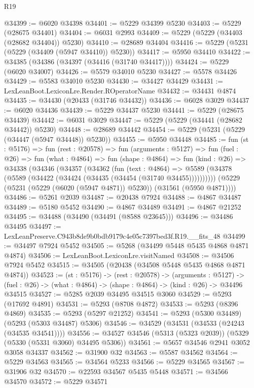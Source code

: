 \begin{lexlean}{R19}
\begin{coremodule}
@34399 := @6020 @34398
@34401 := @5229 @34399 @5230
@34403 := @5229 (@28675 @34401)
@34404 := @6031 @2993
@34409 := @5229 (@5229 (@34403 (@28682 @34404)) @5230)
@34410 := @28689 @34404
@34416 := @5229 (@5231 (@5229 (@34409 (@5947 @34410)) @5230))
@34417 := @5950 @34410
@34422 := @34385 (@34386 (@34397 (@34416 (@31740 @34417))))
@34424 := @5229 (@6020 @34007)
@34426 := @5579 @34010 @5230
@34427 := @5578 @34426
@34429 := @5583 @34010 @5230
@34430 := @34427 @34429
@34431 := LexLeanBoot.LexiconLre.Render.ROperatorName
@34432 := @34431 @4874
@34435 := @34430 (@20433 (@31746 @34432))
@34436 := @6028 @3029
@34437 := @6020 @34436
@34439 := @5229 @34437 @5230
@34441 := @5229 (@28675 @34439)
@34442 := @6031 @3029
@34447 := @5229 (@5229 (@34441 (@28682 @34442)) @5230)
@34448 := @28689 @34442
@34454 := @5229 (@5231 (@5229 (@34447 (@5947 @34448)) @5230))
@34455 := @5950 @34448
@34485 := fun (st : @5176) =>
  fun (rest : @20578) =>
  fun (arguments : @5127) =>
  fun (fuel : @26) =>
  fun (what : @4864) =>
  fun (shape : @4864) =>
  fun (kind : @26) =>
  @34338
    (@34346
      (@34357
        (@34362
          (fun (text : @4864) =>
          @5589 (@34378 (@5589 (@34422 (@34424 (@34435 (@34454 (@31740 @34455))))))))))
      (@5229 (@5231 (@5229 (@6020 (@5947 @4871)) @5230)) (@31561 (@5950 @4871))))
@34486 := @5261 @2039
@34487 := @20438 @7924
@34488 := @4867 @34487
@34489 := @5180 @5452
@34490 := @4867 @34489
@34491 := @4867 @21252
@34495 := @34488 (@34490 (@34491 (@8588 @23645)))
@34496 := @34486 @34495
@34497 := LexLeanPreserve.C943b8de9b0bdb9179c4e05c7397bed3f.R19.__fits_48
@34499 := @34497 @7924 @5452
@34505 := @5268 (@34499 @5448 @5435 @4868 @4871 @4874)
@34506 := LexLeanBoot.LexiconLre.visitNamed
@34508 := @34506 @7924 @5452
@34515 := @34505 (@20438 (@34508 @5448 @5435 @4868 @4871 @4874))
@34523 := (st : @5176) ->
  (rest : @20578) ->
  (arguments : @5127) ->
  (fuel : @26) -> (what : @4864) -> (shape : @4864) -> (kind : @26) -> @34496 @34515
@34527 := @5285 @2039 @34495 @34515 @3060
@34529 := @5293 (@17692 @4891)
@34531 := @5293 (@8708 @4872)
@34533 := @5293 (@8396 @4869)
@34535 := @5293 (@5297 @21252)
@34541 := @5293 (@5300 @34489) (@5293 (@5303 @34487) @5306)
@34546 := @34529 (@34531 (@34533 (@24243 (@34535 @34541))))
@34556 := @34527 @34546 (@5313 (@5323 @2039)) (@5329 (@5330 (@5331 @3060) @34495 @5306))
@34561 := @5657 @34546 @2941 @3052 @3058 @34337
@34562 := @31900 @32
@34563 := @5587 @34562
@34564 := @5229 @34563
@34565 := @34564 @5233
@34566 := @5229 @34565
@34567 := @31906 @32
@34570 := @22593 @34567 @5435 @5448
@34571 := @34566 @34570
@34572 := @5229 @34571

\end{coremodule}
\end{lexlean}
